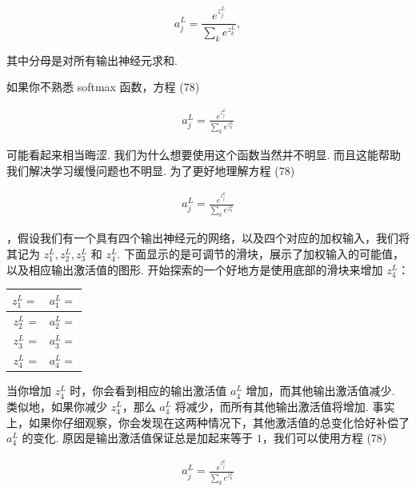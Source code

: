 \begin{equation}
a^L_j = \frac{e^{z^L_j}}{\sum_k e^{z^L_k}},
\tag{78}
\end{equation}

\noindent 其中分母是对所有输出神经元求和.

如果你不熟悉 softmax 函数，方程 (78)

\begin{align*}
a^L_j = \frac{e^{z^L_j}}{\sum_k e^{z^L_k}} \nonumber
\end{align*}

\noindent 可能看起来相当晦涩. 我们为什么想要使用这个函数当然并不明显. 而且这能帮助我们解决学习缓慢问题也不明显. 为了更好地理解方程 (78)

\begin{align*}
a^L_j = \frac{e^{z^L_j}}{\sum_k e^{z^L_k}} \nonumber
\end{align*}

\noindent，假设我们有一个具有四个输出神经元的网络，以及四个对应的加权输入，我们将其记为 $z^L_1, z^L_2, z^L_3$ 和 $z^L_4$. 下面显示的是可调节的滑块，展示了加权输入的可能值，以及相应输出激活值的图形. 开始探索的一个好地方是使用底部的滑块来增加 $z^L_4$：

\begin{table}[htbp]
\centering
\small
\begin{tabular}{cc}
\toprule

$z^L_1 = $ & $a^L_1 = $ \\

\midrule

$z^L_2$ = & $a^L_2 = $ \\

$z^L_3$ = & $a^L_3 = $ \\

$z^L_4$ = & $a^L_4 = $ \\

\bottomrule
\end{tabular}
\end{table}

当你增加 $z^L_4$ 时，你会看到相应的输出激活值 $a^L_4$ 增加，而其他输出激活值减少. 类似地，如果你减少 $z^L_4$，那么 $a^L_4$ 将减少，而所有其他输出激活值将增加. 事实上，如果你仔细观察，你会发现在这两种情况下，其他激活值的总变化恰好补偿了 $a^L_4$ 的变化. 原因是输出激活值保证总是加起来等于 $1$，我们可以使用方程 (78)

\begin{align*}
a^L_j = \frac{e^{z^L_j}}{\sum_k e^{z^L_k}} \nonumber
\end{align*}

